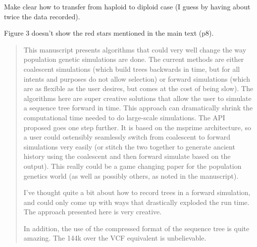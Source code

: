 

\begin{point}{}
  Make clear how to transfer from haploid to diploid case (I guess by having
  about twice the data recorded).
\end{point}


\begin{point}{}
  Figure 3 doesn't show the red stars mentioned in the main text (p8).
\end{point}






\begin{quote}
    This manuscript presents algorithms that could very well change the way
    population genetic simulations are done. The current methods are either
    coalescent simulations (which build trees backwards in time, but for all
    intents and purposes do not allow selection) or forward simulations (which are
    as flexible as the user desires, but comes at the cost of being slow). The
    algorithms here are super creative solutions that allow the user to simulate a
    sequence tree forward in time. This approach can dramatically shrink the
    computational time needed to do large-scale simulations. The API proposed goes
    one step further. It is based on the msprime architecture, so a user could
    ostensibly seamlessly switch from coalescent to forward simulations very easily
    (or stitch the two together to generate ancient history using the coalescent
    and then forward simulate based on the output). This really could be a game
    changing paper for the population genetics world (as well as possibly others,
    as noted in the manuscript).

    I've thought quite a bit about how to record trees in a forward simulation, and
    could only come up with ways that drastically exploded the run time. The
    approach presented here is very creative.

    In addition, the use of the compressed format of the sequence tree is quite
    amazing. The 144k over the VCF equivalent is unbelievable.
\end{quote}

